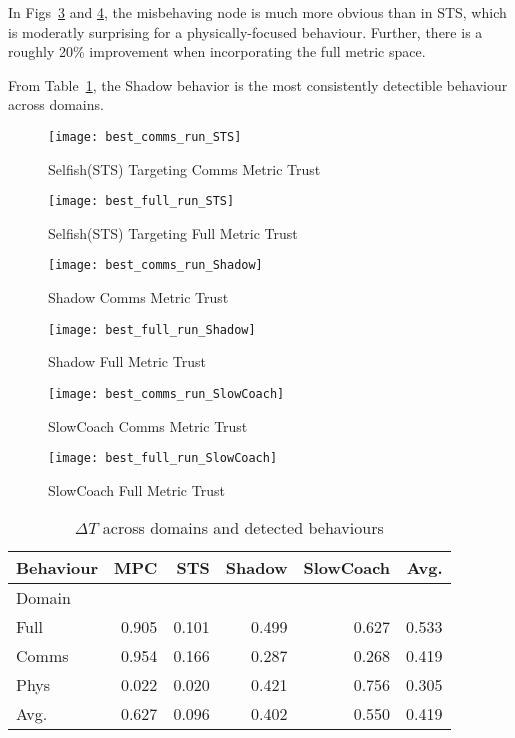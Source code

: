 In Figs~\ref{fig:comms_shadow} and \ref{fig:full_shadow}, the misbehaving node is much more obvious than in STS, which is moderatly surprising for a physically-focused behaviour. Further, there is a roughly 20\% improvement when incorporating the full metric space.

From Table~\ref{tab:domain_deltas}, the Shadow behavior is the most consistently detectible behaviour across domains. 

\begin{figure}[h]
	\centering
	\texttt{[image: best\_comms\_run\_STS]}
	\caption{Selfish(STS) Targeting Comms Metric Trust}
	\label{fig:comms_sts}
\end{figure}

\begin{figure}[h]
	\centering
	\texttt{[image: best\_full\_run\_STS]}
	\caption{Selfish(STS) Targeting Full Metric Trust}
	\label{fig:full_sts}
\end{figure}

\begin{figure}[h]
	\centering
	\texttt{[image: best\_comms\_run\_Shadow]}
	\caption{Shadow Comms Metric Trust}
	\label{fig:comms_shadow}
\end{figure}

\begin{figure}[h]
	\centering
	\texttt{[image: best\_full\_run\_Shadow]}
	\caption{Shadow Full Metric Trust}
	\label{fig:full_shadow}
\end{figure}


\begin{figure}[h]
	\centering
  \texttt{[image: best\_comms\_run\_SlowCoach]}
	\caption{SlowCoach Comms Metric Trust}
	\label{fig:comms_slowcoach}
\end{figure}


\begin{figure}[h]
	\centering
  \texttt{[image: best\_full\_run\_SlowCoach]}
	\caption{SlowCoach Full Metric Trust}
	\label{fig:full_slowcoach}
\end{figure}


\begin{table}
\centering
\caption{$\Delta T$ across domains and detected behaviours}
\begin{tabular}{|l|r|r|r|r|r|}
\hline
Behaviour &       MPC &       STS &    Shadow & SlowCoach & Avg.\\
\hline
Domain &           &           &           &           &\\
Full   &  0.905 &  0.101 &  0.499 &  0.627 & 0.533\\
Comms  &  0.954 &  0.166 &  0.287 &  0.268 & 0.419 \\
Phys   &  0.022 &  0.020 &  0.421 &  0.756 & 0.305\\
\hline
Avg.   &  0.627 &  0.096 &  0.402 &  0.550 &  0.419 \\
\hline
\end{tabular}
\label{tab:domain_deltas}
\end{table}

